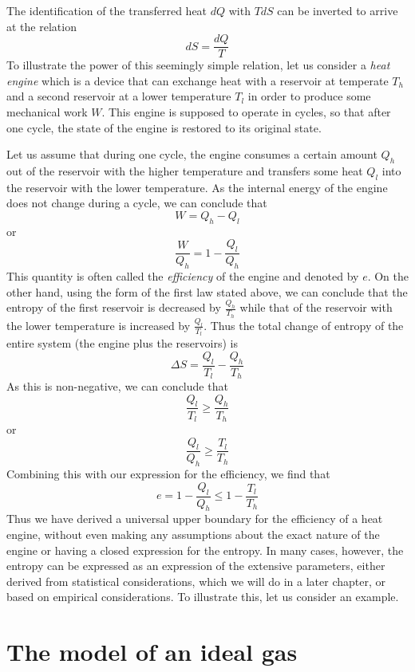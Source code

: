 \documentclass[a4paper, draft]{article}
\theoremstyle{own}
\theoremstyle{remark}
\begin{document}
The identification of the transferred heat $dQ $ with $TdS$ can be inverted to arrive at the relation 
$$
dS = \frac{dQ}{T}
$$
To illustrate the power of this seemingly simple relation, let us consider a {\em heat engine} which is a device that can exchange heat with a reservoir at temperate $T_h$ and a second reservoir at a lower temperature $T_l$ in order to produce some mechanical work $W$. This engine is supposed to operate in cycles, so that after one cycle, the state of the engine is restored to its original state. 

Let us assume that during one cycle, the engine consumes a certain amount $Q_h$ out of the reservoir with the higher temperature and transfers some heat $Q_l$ into the reservoir with the lower temperature. As the internal energy of the engine does not change during a cycle, we can conclude that
$$
W = Q_h - Q_l
$$
or 
$$
\frac{W}{Q_h} = 1 - \frac{Q_l}{Q_h}
$$
This quantity is often called the {\em efficiency} of the engine and denoted by $e$. On the other hand, using the form of the first law stated above, we can conclude that the entropy of the first reservoir is decreased by $\frac{Q_h}{T_h}$ while that of the reservoir with the lower temperature is increased by $\frac{Q_l}{T_l}$.
Thus the total change of entropy of the entire system (the engine plus the reservoirs) is
$$
\Delta S = \frac{Q_l}{T_l} - \frac{Q_h}{T_h}
$$
As this is non-negative, we can conclude that
$$
\frac{Q_l}{T_l} \geq \frac{Q_h}{T_h}
$$
or
$$
\frac{Q_l}{Q_h} \geq \frac{T_l}{T_h}
$$
Combining this with our expression for the efficiency, we find that
$$
e = 1 - \frac{Q_l}{Q_h} \leq 1 - \frac{T_l}{T_h}
$$
Thus we have derived a universal upper boundary for the efficiency of a heat engine, without even making any assumptions about the exact nature of the engine or having a closed expression for the entropy. In many cases, however, the entropy can be expressed as an expression of the extensive parameters, either derived from statistical considerations, which we will do in a later chapter, or based on empirical considerations. To illustrate this, let us consider an example.

\section{The model of an ideal gas}
\end{document}
